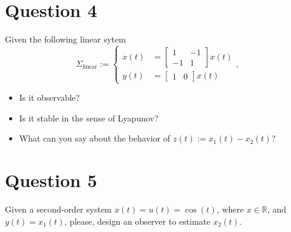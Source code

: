 \documentclass[11pt,a4paper,titlepage]{article}
\begin{document}
\section{Question 4}
Given the following linear sytem
\begin{equation}
	\Sigma_{\text{linear}} := \begin{cases}
		\dot x(t) &= \begin{bmatrix}1 & -1 \\ -1 & 1\end{bmatrix}x(t) \\
			y(t) &= \begin{bmatrix}1 & 0\end{bmatrix}x(t)
	\end{cases},
\label{eq: sigmalin}
\end{equation}

\begin{itemize}
\item Is it observable?
\item Is it stable in the sense of Lyapunov?
\item What can you say about the behavior of $z(t) := x_1(t) - x_2(t)$?
\end{itemize}

\section{Question 5}
Given a second-order system $\ddot x(t) = u(t) = \cos(t)$, where $x\in\mathbb{R}$, and $y(t) = x_1(t)$, please, design an observer to estimate $x_2(t)$.
\end{document}
